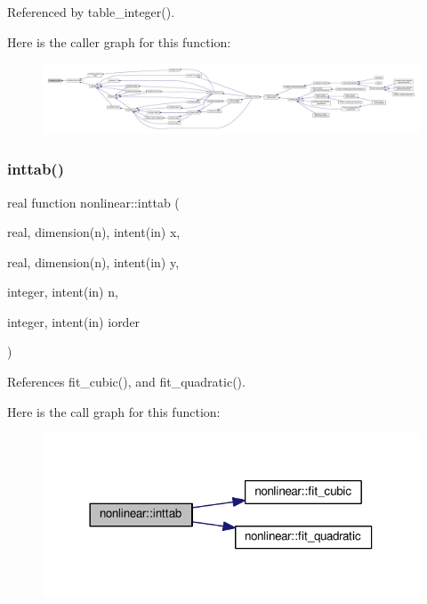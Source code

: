 Referenced by table\+\_\+integer().

Here is the caller graph for this function\+:
\nopagebreak
\begin{figure}[H]
\begin{center}
\leavevmode
\includegraphics[width=350pt]{namespacenonlinear_a0241839029c1aa4d429fb9a516577921_icgraph}
\end{center}
\end{figure}
\mbox{\label{namespacenonlinear_ab7465123b12f301a0d4d5a80c8b35ab5}} 
\subsubsection{\texorpdfstring{inttab()}{inttab()}}
{\footnotesize\ttfamily real function nonlinear\+::inttab (\begin{DoxyParamCaption}\item[{real, dimension(n), intent(in)}]{x,  }\item[{real, dimension(n), intent(in)}]{y,  }\item[{integer, intent(in)}]{n,  }\item[{integer, intent(in)}]{iorder }\end{DoxyParamCaption})\hspace{0.3cm}{\ttfamily [private]}}



References fit\+\_\+cubic(), and fit\+\_\+quadratic().

Here is the call graph for this function\+:
\nopagebreak
\begin{figure}[H]
\begin{center}
\leavevmode
\includegraphics[width=318pt]{namespacenonlinear_ab7465123b12f301a0d4d5a80c8b35ab5_cgraph}
\end{center}
\end{figure}
\mbox{\label{namespacenonlinear_a0e7bfac54def3a760a789b01501ee54b}} 
